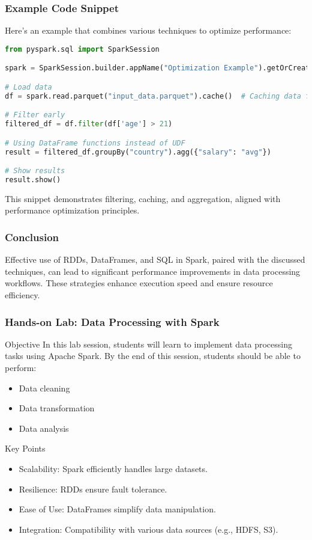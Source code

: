 \documentclass{beamer}
\begin{document}
\begin{frame}[fragile]
    \frametitle{Example Code Snippet}
    Here’s an example that combines various techniques to optimize performance:
    \begin{lstlisting}[language=Python]
from pyspark.sql import SparkSession

spark = SparkSession.builder.appName("Optimization Example").getOrCreate()

# Load data
df = spark.read.parquet("input_data.parquet").cache()  # Caching data for quicker access

# Filter early
filtered_df = df.filter(df['age'] > 21)

# Using DataFrame functions instead of UDF
result = filtered_df.groupBy("country").agg({"salary": "avg"})

# Show results
result.show()
    \end{lstlisting}

    This snippet demonstrates filtering, caching, and aggregation, aligned with performance optimization principles.
\end{frame}

\begin{frame}
    \frametitle{Conclusion}
    Effective use of RDDs, DataFrames, and SQL in Spark, paired with the discussed techniques, can lead to significant performance improvements in data processing workflows. These strategies enhance execution speed and ensure resource efficiency.
\end{frame}

\begin{frame}[fragile]
    \frametitle{Hands-on Lab: Data Processing with Spark}
    
    \begin{block}{Objective}
        In this lab session, students will learn to implement data processing tasks using Apache Spark. By the end of this session, students should be able to perform:
        \begin{itemize}
            \item Data cleaning
            \item Data transformation
            \item Data analysis
        \end{itemize}
    \end{block}

    \begin{block}{Key Points}
        \begin{itemize}
            \item Scalability: Spark efficiently handles large datasets.
            \item Resilience: RDDs ensure fault tolerance.
            \item Ease of Use: DataFrames simplify data manipulation.
            \item Integration: Compatibility with various data sources (e.g., HDFS, S3).
        \end{itemize}
    \end{block}
\end{frame}
\end{document}
